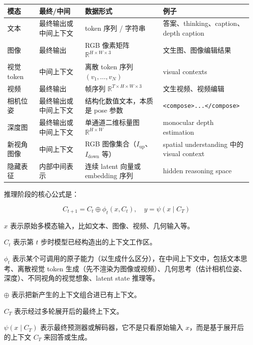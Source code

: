 \begin{longtable}[]{@{}
  >{\raggedright\arraybackslash}p{}
  >{\raggedright\arraybackslash}p{}
  >{\raggedright\arraybackslash}p{}
  >{\raggedright\arraybackslash}p{}@{}}
\toprule
模态 & 最终/中间 & 数据形式 & 例子 \\
\midrule
\endhead
文本 & 最终输出或中间上下文 & token 序列 / 字符串 & 答案、thinking、caption、depth caption \\
图像 & 最终输出 & RGB 像素矩阵 \(\mathbb{R}^{H\times W\times3}\) & 文生图、图像编辑结果 \\
视觉 token & 中间上下文 & 离散 token 序列 \((v_1,\ldots,v_N)\) & visual contexts \\
视频 & 最终输出 & 帧序列 \(\mathbb{R}^{T\times H\times W\times3}\) & 文生视频、视频编辑 \\
相机位姿 & 最终输出或中间上下文 & 结构化数值文本，本质是 pose 参数 & \texttt{\textless{}compose\textgreater{}...\textless{}/compose\textgreater{}} \\
深度图 & 最终输出或中间上下文 & 单通道二维标量图 \(\mathbb{R}^{H\times W}\) & monocular depth estimation \\
新视角图像 & 中间上下文 & RGB 图像集合（\(I_{\mathrm{up}}\)、\(I_{\mathrm{down}}\) 等） & spatial understanding 中的 visual context \\
隐藏表征 & 内部中间表示 & 连续 latent 向量或 embedding 序列 & hidden reasoning space \\
\bottomrule
\end{longtable}

推理阶段的核心公式是：

\[
C_{t+1}=C_t\oplus\phi_t(x,C_t),\quad y=\psi(x\mid C_T)
\]

\(x\) 表示原始多模态输入，比如文本、图像、视频、几何输入等。

\(C_t\) 表示第 \(t\) 步时模型已经构造出的上下文工作区。

\(\phi_t\) 表示某个可调用的原子能力（以生成什么区分），在中间上下文中，包括文本思考、离散视觉 token 生成（先不渲染为图像或视频）、几何思考（估计相机位姿、深度）、不同视角的视觉想象、latent state 推理等。

\(\oplus\) 表示把新产生的上下文组合进已有上下文。

\(C_T\) 表示经过多轮展开后的最终上下文。

\(\psi(x\mid C_T)\) 表示最终预测器或解码器，它不是只看原始输入 \(x\)，而是基于展开后的上下文 \(C_T\) 来回答或生成。

